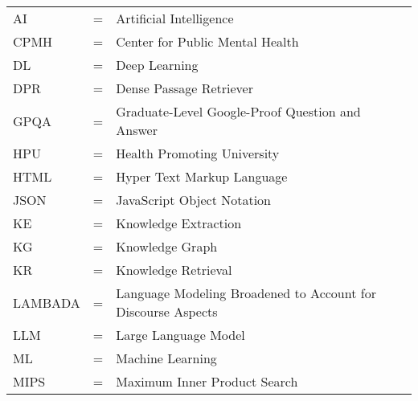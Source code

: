 \begin{tabular}{llp{3in}}
	AI      & \hspace{1.5cm} = & Artificial Intelligence                                      \\
	CPMH    & \hspace{1.5cm} = & Center for Public Mental Health                              \\
	DL      & \hspace{1.5cm} = & Deep Learning                                                \\
	DPR     & \hspace{1.5cm} = & Dense Passage Retriever                                      \\
	GPQA    & \hspace{1.5cm} = & Graduate-Level Google-Proof Question and Answer              \\
	HPU     & \hspace{1.5cm} = & Health Promoting University                                  \\
	HTML    & \hspace{1.5cm} = & Hyper Text Markup Language                                   \\
	JSON    & \hspace{1.5cm} = & JavaScript Object Notation                                   \\
	KE      & \hspace{1.5cm} = & Knowledge Extraction                                         \\
	KG      & \hspace{1.5cm} = & Knowledge Graph                                              \\
	KR      & \hspace{1.5cm} = & Knowledge Retrieval                                          \\
	LAMBADA & \hspace{1.5cm} = & Language Modeling Broadened to Account for Discourse Aspects \\
	LLM     & \hspace{1.5cm} = & Large Language Model                                         \\
	ML      & \hspace{1.5cm} = & Machine Learning                                             \\
	MIPS    & \hspace{1.5cm} = & Maximum Inner Product Search                                 \\

\end{tabular}
